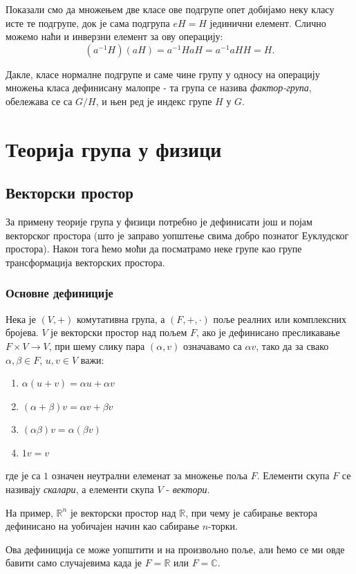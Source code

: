 \documentclass{report}
\theoremstyle{plain}
\theoremstyle{definition}
\begin{document}
Показали смо да множењем две класе ове подгрупе опет добијамо неку класу исте те подгрупе, док је сама подгрупа $eH = H$ јединични елемент. Слично можемо наћи и инверзни елемент за ову операцију:
$$(a^{-1}H)(aH) = a^{-1}HaH = a^{-1}aHH = H.$$

Дакле, класе нормалне подгрупе и саме чине групу у односу на операцију множења класа дефинисану малопре - та група се назива \emph{фактор-група}, обележава се са $G/H$, и њен ред је индекс групе $H$ у $G$.


\chapter{Теорија група у физици}
\section{Векторски простор}
За примену теорије група у физици потребно је дефинисати још и појам векторског простора (што је заправо уопштење свима добро познатог Еуклудског простора). Након тога ћемо моћи да посматрамо неке групе као групе трансформација векторских простора.
\subsection{Основне дефиниције}
Нека је $(V, +)$ комутативна група, а $(F, +, \cdot)$ поље реалних или комплексних бројева. $V$ је векторски простор над пољем $F$, ако је дефинисано пресликавање $F\times V\to V$, при шему слику пара $(\alpha, v)$ означавамо са $\alpha v$, тако да за свако $\alpha, \beta \in F$, $u, v\in V$ важи:
\begin{enumerate}
\item $\alpha(u+v) = \alpha u+\alpha v$
\item $(\alpha + \beta)v = \alpha v+ \beta v$
\item $(\alpha\beta)v = \alpha(\beta v)$
\item $1v = v$
\end{enumerate}
где је са $1$ означен неутрални елеменат за множење поља $F$. Елементи скупа $F$ се називају \emph{скалари}, а елементи скупа $V$ - \emph{вектори}.

На пример, $\mathbb{R}^n$ је векторски простор над $\mathbb{R}$, при чему је сабирање вектора дефинисано на уобичајен начин као сабирање $n$-торки.

Ова дефиниција се може уопштити и на произвољно поље, али ћемо се ми овде бавити само случајевима када је $F=\mathbb{R}$ или $F=\mathbb{C}$.
\end{document}
